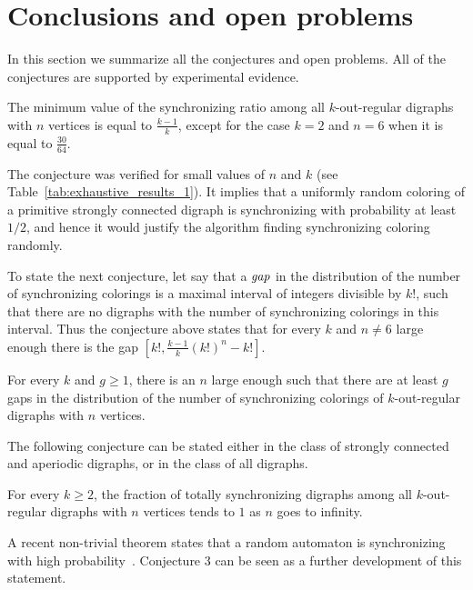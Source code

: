 \documentclass[runningheads]{llncs}
\begin{document}
\section{Conclusions and open problems}

In this section we summarize all the conjectures and open problems.
All of the conjectures are supported by experimental evidence.

\begin{conjecture}
The minimum value of the synchronizing ratio among all $k$-out-regular digraphs with $n$ vertices is equal to $\frac{k-1}{k}$, except for the case $k=2$ and $n=6$ when it is equal to $\frac{30}{64}$.
\end{conjecture}

The conjecture was verified for small values of $n$ and $k$ (see Table~\ref{tab:exhaustive_results_1}).
It implies that a uniformly random coloring of a primitive strongly connected digraph is synchronizing with probability at least $1/2$, and hence it would justify the algorithm finding synchronizing coloring randomly.

To state the next conjecture, let say that a $\emph{gap}$ in the distribution of the number of synchronizing colorings is a maximal interval of integers divisible by $k!$, such that there are no digraphs with the number of synchronizing colorings in this interval.
Thus the conjecture above states that for every $k$ and $n \neq 6$ large enough there is the gap $[k!,\frac{k-1}{k}(k!)^n-k!]$.

\begin{conjecture}
For every $k$ and $g \ge 1$, there is an $n$ large enough such that there are at least $g$ gaps in the distribution of the number of synchronizing colorings of $k$-out-regular digraphs with $n$ vertices.
\end{conjecture}

The following conjecture can be stated either in the class of strongly connected and aperiodic digraphs, or in the class of all digraphs.

\begin{conjecture}
For every $k \ge 2$, the fraction of totally synchronizing digraphs among all $k$-out-regular digraphs with $n$ vertices tends to $1$ as $n$ goes to infinity.
\end{conjecture}
A recent non-trivial theorem states that a random automaton is synchronizing with high probability~\cite{Berlinkov2013OnTheProbabilityToBeSynchronizable,Nicaud2014FastSynchronizationOfRandomAutomata}. Conjecture 3 can be seen as a further development of this statement.
\end{document}
